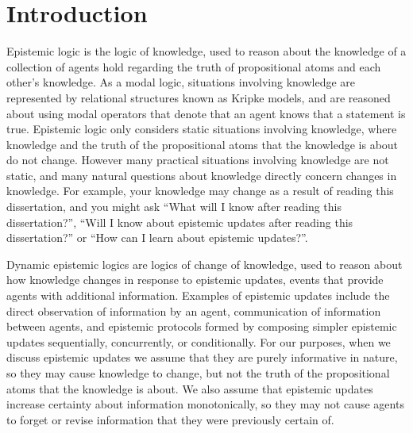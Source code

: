 \chapter{Introduction}\label{introduction}

Epistemic logic is the logic of knowledge, used to reason about the knowledge of a collection of agents hold regarding the truth of propositional atoms and each other's knowledge.
As a modal logic, situations involving knowledge are represented by relational structures known as Kripke models, and are reasoned about using modal operators that denote that an agent knows that a statement is true.
Epistemic logic only considers static situations involving knowledge, where knowledge and the truth of the propositional atoms that the knowledge is about do not change.
However many practical situations involving knowledge are not static, and many natural questions about knowledge directly concern changes in knowledge.
For example, your knowledge may change as a result of reading this dissertation, and you might ask ``What will I know after reading this dissertation?'', ``Will I know about epistemic updates after reading this dissertation?'' or ``How can I learn about epistemic updates?''.

Dynamic epistemic logics are logics of change of knowledge, used to reason about how knowledge changes in response to epistemic updates, events that provide agents with additional information.
Examples of epistemic updates include the direct observation of information by an agent, communication of information between agents, and epistemic protocols formed by composing simpler epistemic updates sequentially, concurrently, or conditionally.
For our purposes, when we discuss epistemic updates we assume that they are purely informative in nature, so they may cause knowledge to change, but not the truth of the propositional atoms that the knowledge is about.
We also assume that epistemic updates increase certainty about information monotonically, so they may not cause agents to forget or revise information that they were previously certain of. 

